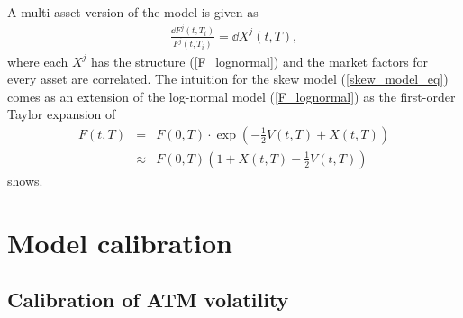 \documentclass[12pt]{article}
\begin{document}
%
%
\noindent 
A multi-asset version of the model is given as 
\begin {eqnarray*}
  \frac { \dd F^j (t,T_i) } {F^j (t,T_i) } 
  = 
  \dd X^j (t,T) ,
\end {eqnarray*}
where each $X^j$ has the structure (\ref{F_lognormal}) and the 
market factors for every asset are correlated. 
The intuition for the skew model (\ref{skew_model_eq}) comes as an extension 
of the log-normal model (\ref{F_lognormal}) as the first-order Taylor expansion of 
\begin {eqnarray*}
  F(t,T) & = & F(0,T) \cdot \exp \left( 
  - \frac 1 2 V(t,T) + X(t,T)
  \right)
  \\
  & \approx & 
  F(0,T) ( 1 + X(t,T) - \frac 1 2 V(t,T) )
\end {eqnarray*}
shows.


\section {Model calibration}
\label {section_model_calibration}

\subsection {Calibration of ATM volatility}
\label {atm_calib}
\end{document}
